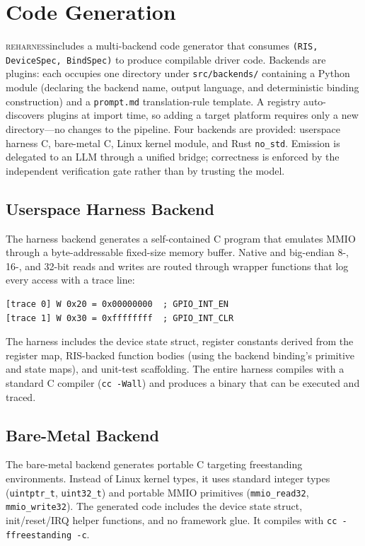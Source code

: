 \documentclass[sigplan, screen, review, anonymous]{acmart}
\newcommand{\reharness}{\textsc{reharness}}
\begin{document}
\section{Code Generation}

\reharness includes a multi-backend code generator that consumes \texttt{(RIS, DeviceSpec, BindSpec)} to produce compilable driver code. Backends are plugins: each occupies one directory under \texttt{src/backends/} containing a Python module (declaring the backend name, output language, and deterministic binding construction) and a \texttt{prompt.md} translation-rule template. A registry auto-discovers plugins at import time, so adding a target platform requires only a new directory---no changes to the pipeline. Four backends are provided: userspace harness C, bare-metal C, Linux kernel module, and Rust \texttt{no\_std}. Emission is delegated to an LLM through a unified bridge; correctness is enforced by the independent verification gate rather than by trusting the model.

\subsection{Userspace Harness Backend}

The harness backend generates a self-contained C program that emulates MMIO through a byte-addressable fixed-size memory buffer. Native and big-endian 8-, 16-, and 32-bit reads and writes are routed through wrapper functions that log every access with a trace line:

\begin{lstlisting}
[trace 0] W 0x20 = 0x00000000  ; GPIO_INT_EN
[trace 1] W 0x30 = 0xffffffff  ; GPIO_INT_CLR
\end{lstlisting}

The harness includes the device state struct, register constants derived from the register map, RIS-backed function bodies (using the backend binding's primitive and state maps), and unit-test scaffolding. The entire harness compiles with a standard C compiler (\texttt{cc -Wall}) and produces a binary that can be executed and traced.

\subsection{Bare-Metal Backend}

The bare-metal backend generates portable C targeting freestanding environments. Instead of Linux kernel types, it uses standard integer types (\texttt{uintptr\_t}, \texttt{uint32\_t}) and portable MMIO primitives (\texttt{mmio\_read32}, \texttt{mmio\_write32}). The generated code includes the device state struct, init/reset/IRQ helper functions, and no framework glue. It compiles with \texttt{cc -ffreestanding -c}.
\end{document}
